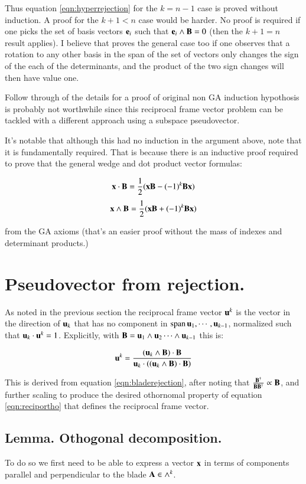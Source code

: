 \documentclass{article}      %
\begin{document}
Thus equation \ref{eqn:hyperrejection} for the $k = n-1$ case is proved without induction.  A proof for the $k+1<n$ case would be harder.
No proof is required if one picks the set of basis vectors ${\mathbf{e}_i}$ such that $\mathbf{e}_i \wedge \mathbf{B} = 0$ (then the $k+1=n$ result applies).
I believe that proves the general case too if one observes that a rotation to any other basis in the span of the set of vectors only
changes the sign of the each of the determinants, and the product of the two sign changes will then have value one.

Follow through of the details for a proof of original non GA induction hypothosis is probably not worthwhile since this
reciprocal frame vector problem can be
tackled with a different approach using a subspace pseudovector.

It's notable that although this had no induction in the argument above, note that it is fundamentally required.
That is because there is an inductive proof
required to prove that the general wedge and dot product vector formulas:

\[
\mathbf{x} \cdot \mathbf{B} = \frac{1}{2}(\mathbf{x} \mathbf{B} - (-1)^k\mathbf{B} \mathbf{x})
\]
\[
\mathbf{x} \wedge \mathbf{B} = \frac{1}{2}(\mathbf{x} \mathbf{B} + (-1)^k\mathbf{B} \mathbf{x})
\]

from the GA axioms (that's an easier proof without the mass of indexes and determinant products.) 

\section{ Pseudovector from rejection. }

As noted in the previous section the reciprocal frame vector $\mathbf{u}^k$ is the vector in the direction of $\mathbf{u}_k$ that has no component
in $\operatorname{span}{ \mathbf{u}_1, \cdots, \mathbf{u}_{k-1}}$, normalized such that $\mathbf{u}_k \cdot \mathbf{u}^k = 1$.  Explicitly, with
$\mathbf{B} = \mathbf{u}_1 \wedge \mathbf{u}_2 \cdots \wedge \mathbf{u}_{k-1}$ this is:

\begin{equation}\label{eqn:reciprej}
\mathbf{u}^k = 
\frac
{
(\mathbf{u}_k \wedge \mathbf{B}) \cdot \mathbf{B}
}
{
\mathbf{u}_k \cdot \left((\mathbf{u}_k \wedge \mathbf{B}) \cdot \mathbf{B}\right)
}
\end{equation}

This is derived from equation \ref{eqn:bladerejection}, after noting that
$\frac{\mathbf{B}^\dagger}{\mathbf{B}\mathbf{B}^\dagger} \propto \mathbf{B}$, and further
scaling to produce the desired othornomal property of equation
\ref{eqn:reciportho}
that defines the reciprocal frame vector.

\subsection{ Lemma.  Othogonal decomposition. }
To do so we first need to be able to express a vector $\mathbf{x}$ in terms
of components parallel and perpendicular to the blade $\mathbf{A} \in \wedge^k$.
\end{document}

